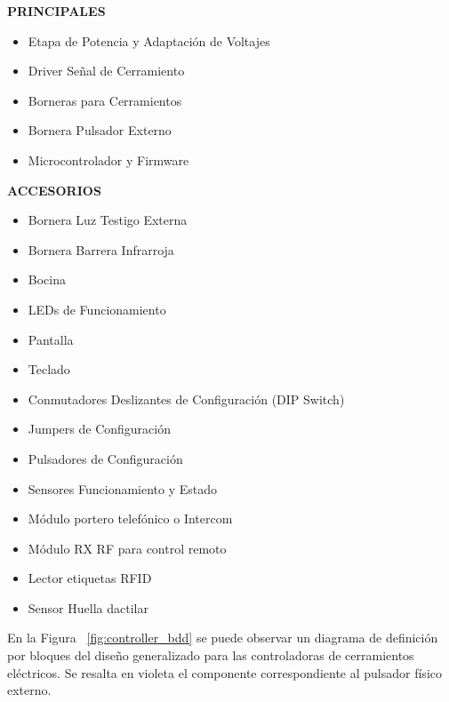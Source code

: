 \textbf{PRINCIPALES}
\begin{itemize}
	\item Etapa de Potencia y Adaptación de Voltajes 
	\item Driver Señal de Cerramiento
	\item Borneras para Cerramientos
	\item Bornera Pulsador Externo
	\item Microcontrolador y Firmware
\end{itemize}
\textbf{ACCESORIOS}
\begin{itemize}
	\item Bornera Luz Testigo Externa
	\item Bornera Barrera Infrarroja
	\item Bocina
	\item LEDs de Funcionamiento
	\item Pantalla
	\item Teclado
	\item Conmutadores Deslizantes de Configuración (DIP Switch)
	\item Jumpers de Configuración
	\item Pulsadores de Configuración
	\item Sensores Funcionamiento y Estado
	\item Módulo portero telefónico o Intercom
	\item Módulo RX RF para control remoto
	\item Lector etiquetas RFID
	\item Sensor Huella dactilar
\end{itemize}
En la Figura ~\ref{fig:controller_bdd} se puede observar un diagrama de definición por bloques del diseño generalizado para las controladoras de cerramientos eléctricos. Se resalta en violeta el componente correspondiente al pulsador físico externo.\\
